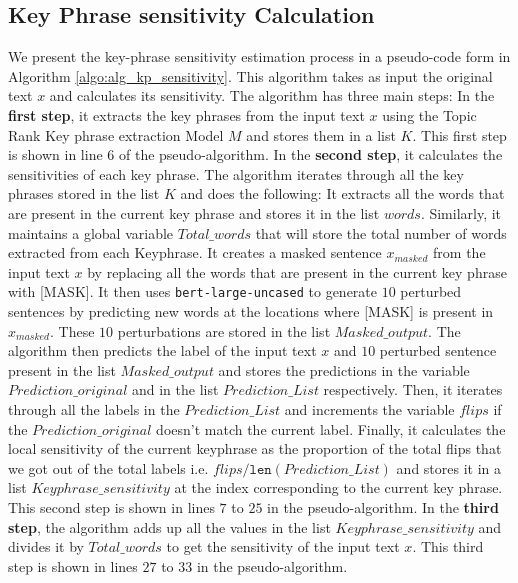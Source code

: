 \subsection{Key Phrase sensitivity Calculation}
\label{Keyphrase_sensitivity}
We present the key-phrase sensitivity estimation process in a pseudo-code form in Algorithm \ref{algo:alg_kp_sensitivity}. This algorithm takes as input the original text $x$ and calculates its sensitivity. The algorithm has three main steps: In the \textbf{first step}, it extracts the key phrases from the input text $x$ using the Topic Rank Key phrase extraction Model $M$ and stores them in a list $K$. This first step is shown in line $6$ of the pseudo-algorithm. In the \textbf{second step}, it calculates the sensitivities of each key phrase. The algorithm iterates through all the key phrases stored in the list $K$ and does the following:  It extracts all the words that are present in the current key phrase and stores it in the list $words$. Similarly, it maintains a global variable $Total\_words$ that will store the total number of words extracted from each Keyphrase.  It creates a masked sentence $x_{masked}$ from the input text $x$ by replacing all the words that are present in the current key phrase with [MASK].  It then uses \texttt{bert-large-uncased} to generate $10$ perturbed sentences by predicting new words at the locations where [MASK] is present in $x_{masked}$. These $10$ perturbations are stored in the list $Masked\_output$.  The algorithm then predicts the label of the input text $x$ and $10$ perturbed sentence present in the list $Masked\_output$ and stores the predictions in the variable $P rediction\_original$ and in the list $Prediction\_List$ respectively.  Then, it iterates through all the labels in the $Prediction\_List$ and increments the variable $flips$ if the $P rediction\_original$
doesn't match the current label. 
  Finally, it calculates the local sensitivity of the current keyphrase as the proportion of the total flips that we got out of the total labels i.e. $flips / \texttt{len}(Prediction\_List)$ and stores it in a list $Keyphrase\_sensitivity$ at the index corresponding to the current key phrase. This second step is shown in lines $7$ to $25$ in the pseudo-algorithm. In the \textbf{third step}, the algorithm adds up all the values in the list $Keyphrase\_sensitivity$ and divides it by $Total\_words$ to get the sensitivity of the input text $x$. This third step is shown in lines $27$ to $33$ in the pseudo-algorithm.

